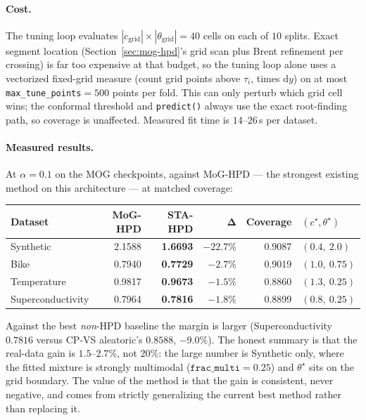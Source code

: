 \documentclass[11pt]{article}
\begin{document}
\paragraph{Cost.} The tuning loop evaluates $|c_{\mathrm{grid}}|\times|\theta_{\mathrm{grid}}|=40$
cells on each of $10$ splits. Exact segment location (Section~\ref{sec:mog-hpd}'s grid scan
plus Brent refinement per crossing) is far too expensive at that budget, so the tuning loop alone
uses a vectorized fixed-grid measure (count grid points above $\tau_i$, times $\mathrm dy$) on at
most \texttt{max\_tune\_points}$=500$ points per fold. This can only perturb which grid cell wins;
the conformal threshold and \texttt{predict()} always use the exact root-finding path, so coverage
is unaffected. Measured fit time is $14$--$26$\,s per dataset.

\paragraph{Measured results.} At $\alpha=0.1$ on the MOG checkpoints, against MoG-HPD --- the
strongest existing method on this architecture --- at matched coverage:

\begin{center}
\begin{tabular}{@{}lrrrrl@{}}
\toprule
\textbf{Dataset} & \textbf{MoG-HPD} & \textbf{STA-HPD} & $\bm\Delta$ & \textbf{Coverage} &
$(c^\star,\theta^\star)$ \\
\midrule
Synthetic          & 2.1588 & \textbf{1.6693} & $-22.7\%$ & 0.9087 & $(0.4,\ 2.0)$ \\
Bike               & 0.7940 & \textbf{0.7729} & $-2.7\%$  & 0.9019 & $(1.0,\ 0.75)$ \\
Temperature        & 0.9817 & \textbf{0.9673} & $-1.5\%$  & 0.8860 & $(1.3,\ 0.25)$ \\
Superconductivity  & 0.7964 & \textbf{0.7816} & $-1.8\%$  & 0.8899 & $(0.8,\ 0.25)$ \\
\bottomrule
\end{tabular}
\end{center}

Against the best \emph{non}-HPD baseline the margin is larger (Superconductivity $0.7816$ versus
CP-VS aleatoric's $0.8588$, $-9.0\%$). The honest summary is that the real-data gain is
$1.5$--$2.7\%$, not $20\%$: the large number is Synthetic only, where the fitted mixture is
strongly multimodal ($\texttt{frac\_multi}=0.25$) and $\theta^\star$ sits on the grid boundary. The
value of the method is that the gain is consistent, never negative, and comes from strictly
generalizing the current best method rather than replacing it.
\end{document}
